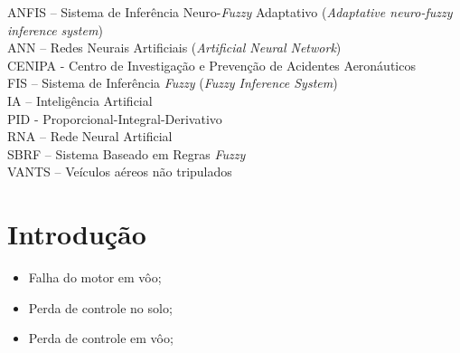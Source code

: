 \documentclass[10pt,a4paper]{article}
\numberwithin{equation}{section}
\begin{document}
\noindent ANFIS – Sistema de Inferência Neuro-\textit{Fuzzy} Adaptativo (\textit{Adaptative neuro-fuzzy inference system})\\
ANN – Redes Neurais Artificiais (\textit{Artificial Neural Network})\\
CENIPA - Centro de Investigação e Prevenção de Acidentes Aeronáuticos\\
FIS – Sistema de Inferência \textit{Fuzzy} (\textit{Fuzzy Inference System})\\
IA – Inteligência Artificial\\
PID - Proporcional-Integral-Derivativo\\
RNA – Rede Neural Artificial\\
SBRF – Sistema Baseado em Regras \textit{Fuzzy}\\
VANTS – Veículos aéreos não tripulados\\







\newpage
\tableofcontents
\newpage
{}
\setcounter{page}{12}
\section{Introdução}

\begin{itemize}
\item Falha do motor em vôo;
\item Perda de controle no solo;
\item Perda de controle em vôo;
\end{itemize}
\end{document}
